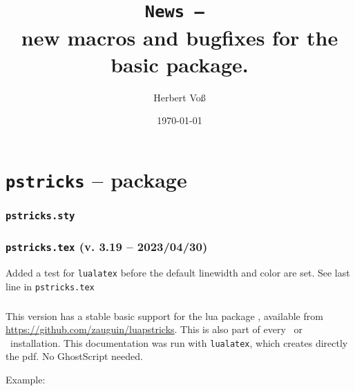 \documentclass[11pt,english,BCOR=10mm,DIV=12,bibliography=totoc,parskip=false,headings=small,
    headinclude=false,footinclude=false,twoside,usegeometry,dvipsnames]{pst-doc}
\begin{document}
\title{\texttt{News -- \the\year}\\ \Large new macros and bugfixes for the basic package.}
\author{Herbert Voß}
\date{\today}

\settitle

\tableofcontents

\part{\texttt{pstricks} -- package}

\section{\texttt{pstricks.sty}}

\section{\texttt{pstricks.tex} (v. 3.19 -- 2023/04/30)}

Added a test for \verb|lualatex| before the default linewidth and color are set.
See last line in \verb|pstricks.tex|

\section{\LuaLaTeX}\label{lua}
This version has a stable basic support for the lua package
, available from \url{https://github.com/zauguin/luapstricks}.
This is also part of every \MiKTeX\ or \TeXLive\ installation.  This documentation was
run with \verb|lualatex|, which creates directly the pdf. No GhostScript needed.

Example:
\end{document}
